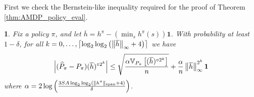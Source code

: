 \documentclass{article}
\theoremstyle{plain}
\theoremstyle{plain}
\newtheorem{lem}[thm]{\protect\lemmaname}
\theoremstyle{remark}
\theoremstyle{plain}
\theoremstyle{plain}
\providecommand{\lemmaname}{Lemma}
\newcommand{\Var}{\mathbb{V}}
\newcommand{\Phat}{\widehat{P}}
\newcommand{\one}{\mathbf{1}}
\newcommand{\hc}{\overline{h}}
\begin{document}
First we check the Bernstein-like inequality required for the proof of Theorem \ref{thm:AMDP_policy_eval}.

\begin{lem}
    \label{lem:simple_AMDP_bernstein_bound}
    Fix a policy $\pi$, and let $\hc = h^\pi - \left( \min_s h^\pi(s)\right) \one$. With probability at least $1 - \delta$, for all $k = 0, \dots, \left\lceil \log_2 \log_2 \left(\infnorm{\hc} + 4 \right) \right\rceil$ we have
    \begin{align*}
        \left|(\Phat_\pi - P_\pi) (\hc)^{\circ 2^k} \right| \leq \sqrt{\frac{\alpha \Var_{P_\pi}\left[(\hc)^{\circ 2^k} \right] }{n}} + \frac{\alpha  }{n} \infnorm{\hc}^{2^k} \one
    \end{align*}
    where $\alpha = 2 \log \left( \frac{3 SA   \log_2 \log_2 \left(\Vert h^\pi\Vert _{\textnormal{span}} + 4 \right) }{\delta }\right)$.
\end{lem}
\end{document}

